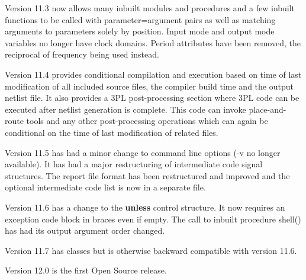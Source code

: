         Version 11.3 now allows many inbuilt modules and procedures and a few
        inbuilt functions to be called with parameter=argument pairs as well
        as matching arguments to parameters solely by position. Input mode and
        output mode variables no longer have clock domains. Period attributes
        have been removed, the reciprocal of frequency being used instead.

        Version 11.4 provides conditional compilation and execution based on
        time of last modification of all included source files, the compiler
        build time and the output netlist file. It also provides a
        3PL post-processing section where 3PL code can be executed after
        netlist generation is complete. This code can invoke place-and-route
        tools and any other post-processing operations which can again
        be conditional on the time of last modification of related files.

        Version 11.5 has had a minor change to command line options (-v
        no longer available). It has had a major restructuring of intermediate
        code signal structures. The report file format has been restructured
        and improved and the optional intermediate code list is now in
        a separate file.

        Version 11.6 has a change to the {\bf unless} control structure. It now
        requires an exception  code block in braces even if empty. The call to
        inbuilt procedure shell() has had its output argument order changed.

        Version 11.7 has classes but is otherwise backward compatible with
        version 11.6.

        Version 12.0 is the first Open Source release.
